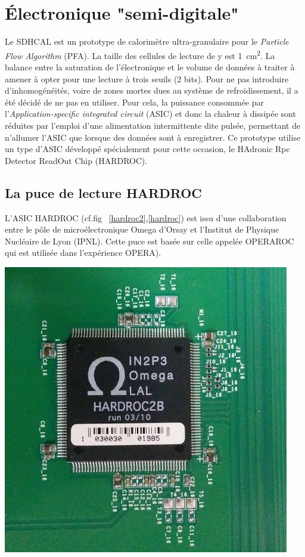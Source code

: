 \section{Électronique "semi-digitale"}
Le SDHCAL est un prototype de calorimètre ultra-granulaire pour le \textit{Particle Flow Algorithm} (PFA). La taille des cellules de lecture de y est  \SI{1}{\square\centi\meter}. La balance entre la saturation de l'électronique et le volume de données à traiter à amener à opter pour une lecture à trois seuils (\num{2} bits). Pour ne pas introduire d'inhomogénéités, voire de zones mortes dues au système de refroidissement, il a été décidé de ne pas en utiliser. Pour cela, la puissance consommée par l'\textit{Application-specific integrated circuit} (ASIC) et donc la chaleur à dissipée sont réduites par l'emploi d'une alimentation intermittente dite pulsée, permettant de n'allumer l'ASIC que lorsque des données sont à enregistrer. Ce prototype utilise un type d'ASIC développé spécialement pour cette occasion, le HAdronic Rpc Detector ReadOut Chip (HARDROC)\cite{Dulucq:2010ssa}.

\subsection{La puce de lecture HARDROC}
L'ASIC HARDROC (cf.fig~ \ref{hardroc2},\ref{hardroc}) est issu d'une collaboration entre le pôle de microélectronique Omega d'Orsay et l'Institut de Physique Nucléaire de Lyon (IPNL). Cette puce est basée sur celle appelée OPERAROC qui est utilisée dans l'expérience OPERA).

\marginpar
{
	\centering
	\includegraphics[width=\marginparwidth]{GLA/hardroc2.jpg}
	\label{hardroc2}
}

